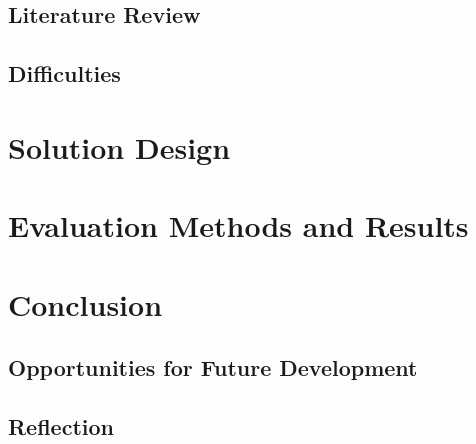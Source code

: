 	\section{Literature Review}
	
	\section{Difficulties}

\chapter{Solution Design}

\chapter{Evaluation Methods and Results}

\chapter{Conclusion}
	\section{Opportunities for Future Development}
	
	\section{Reflection}

\bibliographysection

